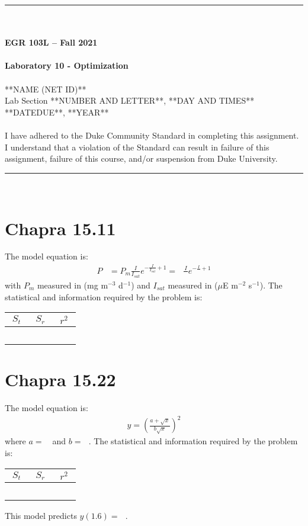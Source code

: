 \documentclass{article}
\begin{document}
\begin{center}
\rule{6.5in}{0.5mm}\\~\\
\textbf{\large EGR 103L -- Fall 2021}\\~\\
\textbf{\huge Laboratory 10 - Optimization}\\~\\
**NAME (NET ID)**\\
Lab Section **NUMBER AND LETTER**, **DAY AND TIMES**\\
**DATEDUE**, **YEAR**\\~\\
{\small I have adhered to the Duke Community Standard in completing this assignment.  I understand that a violation of the Standard can result in failure of this assignment, failure of this course, and/or suspension from Duke University.} 
\rule{6.5in}{0.5mm}\\
\end{center}
\tableofcontents
\listoffigures
\renewcommand{\arraystretch}{1.5}
\clearpage

\section{Chapra 15.11}
The model equation is:
\begin{align*}
P&=P_m\frac{I}{I_{sat}}e^{-\frac{I}{I_{sat}}+1}=
~~~\frac{I}{~~~}e^{-\frac{I}{~~~}+1}
\end{align*}
with $P_m$ measured in (mg m$^{-3}$ d$^{-1}$) and $I_{sat}$ measured
in ($\mu$E m$^{-2}$ s$^{-1}$).
The statistical and information required by the problem is:
\begin{center}
\begin{tabular}{c|c|c}
$S_t$ & $S_r$ & $r^2$\\ \hline
~~~ & ~~~ & ~~~ \\
\end{tabular}
\end{center}

\section{Chapra 15.22}
The model equation is:
\begin{align*}
y=\left(\frac{a+\sqrt{x}}{b\sqrt{x}}\right)^2
\end{align*}
where $a=~~~$ and $b=~~~$. The statistical and information required by the problem is:
\begin{center}
\begin{tabular}{c|c|c}
$S_t$ & $S_r$ & $r^2$\\ \hline
~~~ & ~~~ & ~~~ \\
\end{tabular}
\end{center}
This model predicts $y(1.6)=~~~$.
\end{document}
